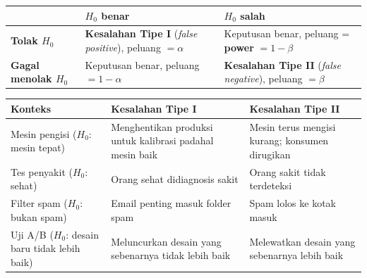 \documentclass[
  indonesian,
  letterpaper,
]{book}
\newcounter{none} %
\begin{document}
{\def\LTcaptype{none} %
\begin{longtable}[]{@{}
  >{\raggedright\arraybackslash}p{}
  >{\raggedright\arraybackslash}p{}
  >{\raggedright\arraybackslash}p{}@{}}
\toprule\noalign{}
\begin{minipage}[b]{\linewidth}\raggedright
\end{minipage} & \begin{minipage}[b]{\linewidth}\raggedright
\(H_0\) benar
\end{minipage} & \begin{minipage}[b]{\linewidth}\raggedright
\(H_0\) salah
\end{minipage} \\
\midrule\noalign{}
\endhead
\bottomrule\noalign{}
\endlastfoot
\textbf{Tolak \(H_0\)} & \textbf{Kesalahan Tipe I} (\emph{false
positive}), peluang \(= \alpha\) & Keputusan benar, peluang =
\textbf{power} \(= 1 - \beta\) \\
\textbf{Gagal menolak \(H_0\)} & Keputusan benar, peluang
\(= 1 - \alpha\) & \textbf{Kesalahan Tipe II} (\emph{false negative}),
peluang \(= \beta\) \\
\end{longtable}
}

{\def\LTcaptype{none} %
\begin{longtable}[]{@{}
  >{\raggedright\arraybackslash}p{}
  >{\raggedright\arraybackslash}p{}
  >{\raggedright\arraybackslash}p{}@{}}
\toprule\noalign{}
\begin{minipage}[b]{\linewidth}\raggedright
Konteks
\end{minipage} & \begin{minipage}[b]{\linewidth}\raggedright
Kesalahan Tipe I
\end{minipage} & \begin{minipage}[b]{\linewidth}\raggedright
Kesalahan Tipe II
\end{minipage} \\
\midrule\noalign{}
\endhead
\bottomrule\noalign{}
\endlastfoot
Mesin pengisi (\(H_0\): mesin tepat) & Menghentikan produksi untuk
kalibrasi padahal mesin baik & Mesin terus mengisi kurang; konsumen
dirugikan \\
Tes penyakit (\(H_0\): sehat) & Orang sehat didiagnosis sakit & Orang
sakit tidak terdeteksi \\
Filter spam (\(H_0\): bukan spam) & Email penting masuk folder spam &
Spam lolos ke kotak masuk \\
Uji A/B (\(H_0\): desain baru tidak lebih baik) & Meluncurkan desain
yang sebenarnya tidak lebih baik & Melewatkan desain yang sebenarnya
lebih baik \\
\end{longtable}
}
\end{document}
